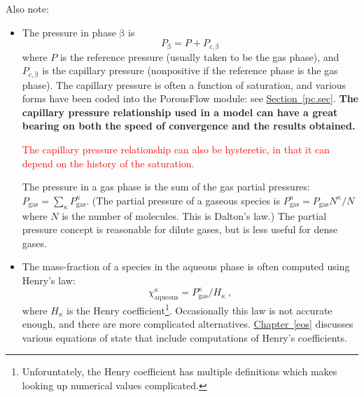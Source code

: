 \documentclass[12pt]{report}
\def\species{\kappa}
\def\phase{\mathrm{\beta}}
\def\massfrac{\chi}
\begin{document}
Also note:

\begin{itemize}
\item The pressure in phase $\phase$ is
\begin{equation}
P_{\phase} = P + P_{c,\phase}
\end{equation}
where $P$ is the reference pressure (usually taken to be the gas
phase), and $P_{c,\phase}$ is the capillary pressure (nonpositive if
the reference phase is the gas phase).   The capillary pressure is
often a function of saturation, and various forms have been coded into
the PorousFlow module: see \hyperref[pc.sec]{Section~\ref*{pc.sec}}.  {\bf The capillary
pressure relationship used in a model can have a great bearing on both the speed
of convergence and the results obtained.}

\textcolor{red}{The capillary pressure relationship can also be
  hysteretic, in that it can depend on the history of the saturation.}

The pressure in a gas phase is
the sum of the gas partial pressures: $P_{\mathrm{gas}} =
\sum_{\species}P_{\mathrm{gas}}^{\species}$.  (The partial pressure of
a gaseous species is $P_{\mathrm{gas}}^{\species} =
P_{\mathrm{gas}}N^{\species}/N$ where $N$ is the number of molecules.
This is Dalton's law.) The partial pressure concept is reasonable for
  dilute gases, but is less useful for dense gases.

\item The mass-fraction of a species in the aqueous phase is often computed
using Henry's law:
\begin{equation}
\massfrac_{\mathrm{aqueous}}^{\species} =
  P_{\mathrm{gas}}^{\species}/H_{\species} \ ,
\end{equation}
where $H_{\species}$ is the Henry coefficient\footnote{Unforuntately,
  the Henry coefficient has multiple definitions which makes looking
  up numerical values complicated.}.  Occasionally this law is not
accurate enough, and there are more complicated alternatives.
\hyperref[eos]{Chapter~\ref*{eos}} discusses various equations of state that include
computations of Henry's coefficients.


\end{itemize}
\end{document}
